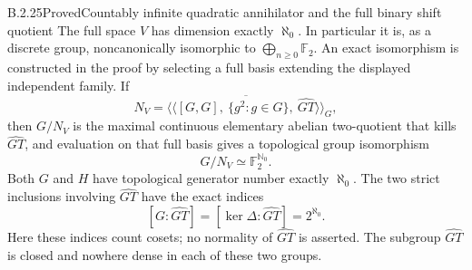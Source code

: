 \begin{result}{B.2.25}{Proved}{Countably infinite quadratic annihilator and the full binary shift quotient}
The full space $V$ has dimension exactly $\aleph_0$.  In
particular it is, as a discrete group, noncanonically isomorphic
to $\bigoplus_{n\ge0}\mathbb F_2$.  An exact isomorphism is
constructed in the proof by selecting a full basis extending
the displayed independent family.  If
\[
 N_V=\overline{\langle\!\langle
       [G,G],\ \{g^2:g\in G\},\ \widehat{GT}
                         \rangle\!\rangle}_G,
                                                        \tag{B.I4}
\]
then $G/N_V$ is the maximal continuous elementary abelian
two-quotient that kills $\widehat{GT}$, and evaluation on that
full basis gives a topological group isomorphism
\[
                         G/N_V\simeq\mathbb F_2^{\mathbb N_0}.
                                                        \tag{B.I5}
\]
Both $G$ and $H$ have topological generator number exactly
$\aleph_0$.
The two strict inclusions involving $\widehat{GT}$ have
the exact indices
\[
 [G:\widehat{GT}]=[\ker\Delta:\widehat{GT}]=2^{\aleph_0}.
                                                        \tag{B.I15}
\]
Here these indices count cosets; no normality of
$\widehat{GT}$ is asserted. The subgroup $\widehat{GT}$
is closed and nowhere dense in each of these two groups.
\end{result}

